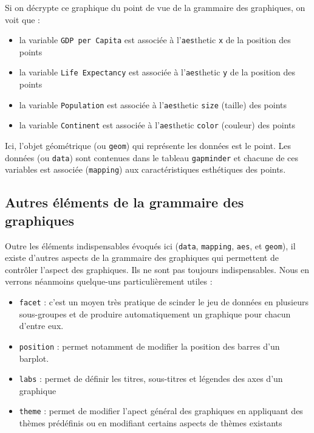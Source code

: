 \documentclass[
  a4paper,
  DIV=11,
  numbers=noendperiod,
  oneside]{scrreprt}
\providecommand{\tightlist}{%
  \setlength{\itemsep}{0pt}\setlength{\parskip}{0pt}}\usepackage{longtable,booktabs,array}
\begin{document}
Si on décrypte ce graphique du point de vue de la grammaire des
graphiques, on voit que :

\begin{itemize}
\tightlist
\item
  la variable \texttt{GDP\ per\ Capita} est associée à
  l'\texttt{aes}thetic \texttt{x} de la position des points
\item
  la variable \texttt{Life\ Expectancy} est associée à
  l'\texttt{aes}thetic \texttt{y} de la position des points
\item
  la variable \texttt{Population} est associée à l'\texttt{aes}thetic
  \texttt{size} (taille) des points
\item
  la variable \texttt{Continent} est associée à l'\texttt{aes}thetic
  \texttt{color} (couleur) des points
\end{itemize}

Ici, l'objet géométrique (ou \texttt{geom}) qui représente les données
est le point. Les données (ou \texttt{data}) sont contenues dans le
tableau \texttt{gapminder} et chacune de ces variables est associée
(\texttt{mapping}) aux caractéristiques esthétiques des points.

\subsection{Autres éléments de la grammaire des
graphiques}\label{autres-uxe9luxe9ments-de-la-grammaire-des-graphiques}

Outre les éléments indispensables évoqués ici (\texttt{data},
\texttt{mapping}, \texttt{aes}, et \texttt{geom}), il existe d'autres
aspects de la grammaire des graphiques qui permettent de contrôler
l'aspect des graphiques. Ils ne sont pas toujours indispensables. Nous
en verrons néanmoins quelque-uns particulièrement utiles :

\begin{itemize}
\tightlist
\item
  \texttt{facet} : c'est un moyen très pratique de scinder le jeu de
  données en plusieurs sous-groupes et de produire automatiquement un
  graphique pour chacun d'entre eux.
\item
  \texttt{position} : permet notamment de modifier la position des
  barres d'un barplot.
\item
  \texttt{labs} : permet de définir les titres, sous-titres et légendes
  des axes d'un graphique
\item
  \texttt{theme} : permet de modifier l'apect général des graphiques en
  appliquant des thèmes prédéfinis ou en modifiant certains aspects de
  thèmes existants
\end{itemize}
\end{document}
